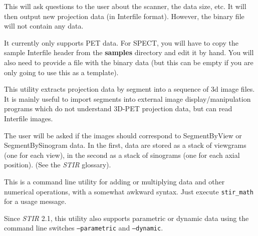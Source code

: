 \documentclass{article}
\begin{document}
This will ask questions to the user about the scanner, the data 
size, etc. It will then output new projection data (in Interfile 
format). However, the binary file will not contain any data.

It currently only supports PET data. For SPECT, you will have to copy the
sample Interfile header from the \textbf{samples} directory and edit it by hand.
You will also need to provide a file with the binary data (but this can be empty if
you are only going to use this as a template).

{ 
}

This utility extracts projection data by segment into a sequence 
of 3d image files. It is mainly useful to import segments into 
external image display/manipulation programs which do not understand 
3D-PET projection data, but can read Interfile images.


The user will be asked if the images should correspond to SegmentByView 
or SegmentBySinogram data. In the first, data are stored as a 
stack of viewgrams (one for each view), in the second as a stack 
of sinograms (one for each axial position). (See the \textit{STIR} glossary).

{ 
}
\label{sec:stir_math}

This is a command line utility for adding or multiplying data 
and other numerical operations, with a somewhat awkward syntax. 
Just execute \texttt{stir\_math} for a usage message.

Since \textit{STIR} 2.1, this utility also supports parametric or dynamic data using
the command line switches \texttt{--parametric} and \texttt{--dynamic}.
\end{document}
